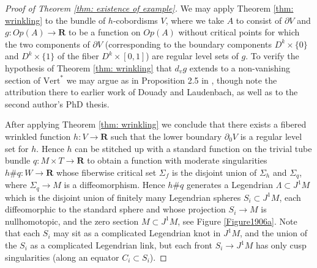 \documentclass{amsart}
\def\bR{\mathbf{R}}
\theoremstyle{definition}
\theoremstyle{remark}
\newtheorem{inductive lemma}[theorem]{Inductive Lemma}
\begin{document}
\begin{proof}[Proof of Theorem \ref{thm: existence of example}]
We may apply Theorem \ref{thm: wrinkling} to the bundle of $h$-cobordisms $V$, where we take $A$ to consist of $\partial V$ and $g: Op(A) \to \bR$ to be a function on $Op(A)$ without critical points for which the two components of $\partial V$ (corresponding to the boundary components $D^k \times \{0\}$ and $D^k \times \{1\}$  of the fiber $D^k \times [0,1]$) are regular level sets of $g$. To verify the hypothesis of Theorem \ref{thm: wrinkling} that $d_vg$ extends to a non-vanishing section of $\text{Vert}^*$ we may argue as in Proposition 2.5 in \cite{EM00}, though note the attribution there to earlier work of Douady and Laudenbach, as well as to the second author's PhD thesis. 

After applying Theorem \ref{thm: wrinkling} we conclude that there exists a fibered wrinkled function $h:V \to \bR$ such that the lower boundary $\partial_0 V$ is a regular level set for $h$. Hence $h$ can be stitched up with a standard function on the trivial tube bundle $q: M \times T \to \bR$ to obtain a function with moderate singularities $h \# q :W \to \bR$ whose fiberwise critical set $\Sigma_f$ is the disjoint union of $\Sigma_h$ and $\Sigma_q$, where $\Sigma_q \to M$ is a diffeomorphism. Hence $h \# q$ generates a Legendrian $\Lambda \subset J^1M$ which is the disjoint union of finitely many Legendrian spheres $S_i \subset J^1M$, each diffeomorphic to the standard sphere and whose projection $S_i \to M$ is nullhomotopic, and the zero section $M \subset J^1M$, see Figure \ref{Figure1906a}. Note that each $S_i$ may sit as a complicated Legendrian knot in $J^1M$, and the union of the $S_i$ as a complicated Legendrian link, but each front $S_i \to J^1M$ has only cusp singularities (along an equator $C_i \subset S_i$). 


\end{proof}
\end{document}
